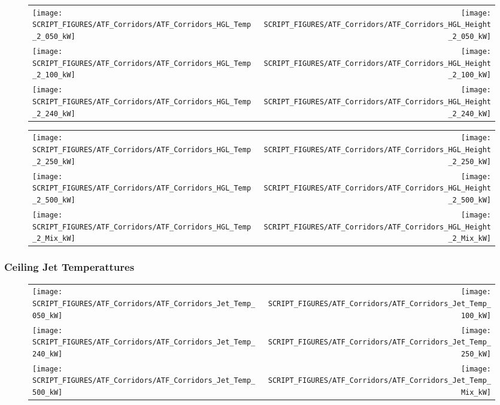 \begin{figure}[!ht]
\begin{tabular*}{\textwidth}{l@{\extracolsep{\fill}}r}
\texttt{[image: SCRIPT\_FIGURES/ATF\_Corridors/ATF\_Corridors\_HGL\_Temp\_2\_050\_kW]} &
\texttt{[image: SCRIPT\_FIGURES/ATF\_Corridors/ATF\_Corridors\_HGL\_Height\_2\_050\_kW]} \\
\texttt{[image: SCRIPT\_FIGURES/ATF\_Corridors/ATF\_Corridors\_HGL\_Temp\_2\_100\_kW]} &
\texttt{[image: SCRIPT\_FIGURES/ATF\_Corridors/ATF\_Corridors\_HGL\_Height\_2\_100\_kW]} \\
\texttt{[image: SCRIPT\_FIGURES/ATF\_Corridors/ATF\_Corridors\_HGL\_Temp\_2\_240\_kW]} &
\texttt{[image: SCRIPT\_FIGURES/ATF\_Corridors/ATF\_Corridors\_HGL\_Height\_2\_240\_kW]}
\end{tabular*}
\end{figure}

\begin{figure}[!ht]
\begin{tabular*}{\textwidth}{l@{\extracolsep{\fill}}r}
\texttt{[image: SCRIPT\_FIGURES/ATF\_Corridors/ATF\_Corridors\_HGL\_Temp\_2\_250\_kW]} &
\texttt{[image: SCRIPT\_FIGURES/ATF\_Corridors/ATF\_Corridors\_HGL\_Height\_2\_250\_kW]} \\
\texttt{[image: SCRIPT\_FIGURES/ATF\_Corridors/ATF\_Corridors\_HGL\_Temp\_2\_500\_kW]} &
\texttt{[image: SCRIPT\_FIGURES/ATF\_Corridors/ATF\_Corridors\_HGL\_Height\_2\_500\_kW]} \\
\texttt{[image: SCRIPT\_FIGURES/ATF\_Corridors/ATF\_Corridors\_HGL\_Temp\_2\_Mix\_kW]} &
\texttt{[image: SCRIPT\_FIGURES/ATF\_Corridors/ATF\_Corridors\_HGL\_Height\_2\_Mix\_kW]}
\end{tabular*}
\end{figure}

\clearpage

\subsubsection{Ceiling Jet Temperattures}

\begin{figure}[!ht]
\begin{tabular*}{\textwidth}{l@{\extracolsep{\fill}}r}
\texttt{[image: SCRIPT\_FIGURES/ATF\_Corridors/ATF\_Corridors\_Jet\_Temp\_050\_kW]} &
\texttt{[image: SCRIPT\_FIGURES/ATF\_Corridors/ATF\_Corridors\_Jet\_Temp\_100\_kW]} \\
\texttt{[image: SCRIPT\_FIGURES/ATF\_Corridors/ATF\_Corridors\_Jet\_Temp\_240\_kW]} &
\texttt{[image: SCRIPT\_FIGURES/ATF\_Corridors/ATF\_Corridors\_Jet\_Temp\_250\_kW]} \\
\texttt{[image: SCRIPT\_FIGURES/ATF\_Corridors/ATF\_Corridors\_Jet\_Temp\_500\_kW]} &
\texttt{[image: SCRIPT\_FIGURES/ATF\_Corridors/ATF\_Corridors\_Jet\_Temp\_Mix\_kW]}
\end{tabular*}
\end{figure}

